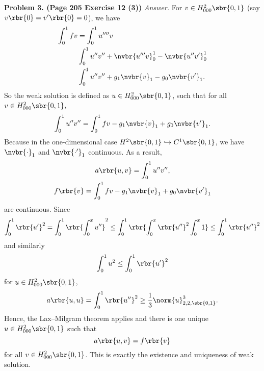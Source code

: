 \documentclass[english, nochinese]{pnote}
\begin{document}
\textbf{Problem 3. (Page 205 Exercise 12 (3))} \textit{Answer.} For $ v \in H^2_{ 0 0 0 } \sbr{ 0, 1 } $ (say $ v \rbr{0} = v' \rbr{0} = 0 $), we have
\begin{equation}
\begin{split}
\int_0^1 f v &= \int_0^1 u'''' v \\
& \int_0^1 u'' v'' + \nvbr{ u''' v }_0^1 - \nvbr{ u'' v' }_0^1 \\
& \int_0^1 u'' v'' + g_1 \nvbr{v}_1 - g_0 \nvbr{v'}_1.
\end{split}
\end{equation}
So the weak solution is defined as $ u \in H^2_{ 0 0 0 } \sbr{ 0, 1 } $, such that for all $ v \in H^2_{ 0 0 0 } \sbr{ 0, 1 } $,
\begin{equation}
\int_0^1 u'' v'' = \int_0^1 f v - g_1 \nvbr{v}_1 + g_0 \nvbr{v'}_1.
\end{equation}
Because in the one-dimensional case $ H^2 \sbr{ 0, 1 } \hookrightarrow C^1 \sbr{ 0, 1 } $, we have $\nvbr{\cdot}_1$ and $\nvbr{\cdot'}_1$ continuous. As a result,
\begin{gather}
a \rbr{ u, v } = \int_0^1 u'' v'', \\
f \rbr{v} = \int_0^1 f v - g_1 \nvbr{v}_1 + g_0 \nvbr{v'}_1
\end{gather}
are continuous. Since
\begin{equation}
\int_0^1 \rbr{u'}^2 = \int_0^1 \rbr{ \int_0^x u'' }^2 \le \int_0^1 \rbr{ \int_0^x \rbr{u''}^2 \int_0^x 1 } \le \int_0^1 \rbr{u''}^2
\end{equation}
and similarly
\begin{equation}
\int_0^1 u^2 \le \int_0^1 \rbr{u'}^2
\end{equation}
for $ u \in H^2_{ 0 0 0 } \sbr{ 0, 1 } $,
\begin{equation}
a \rbr{ u, u } = \int_0^1 \rbr{u''}^2 \ge \frac{1}{3} \norm{u}_{ 2, 2, \sbr{ 0, 1 } }^3.
\end{equation}
Hence, the Lax--Milgram theorem applies and there is one unique $ u \in H^2_{ 0 0 0 } \sbr{ 0, 1 } $ such that
\begin{equation}
a \rbr{ u, v } = f \rbr{v}
\end{equation}
for all $ v \in H^2_{ 0 0 0 } \sbr{ 0, 1 } $. This is exactly the existence and uniqueness of weak solution.
\end{document}
